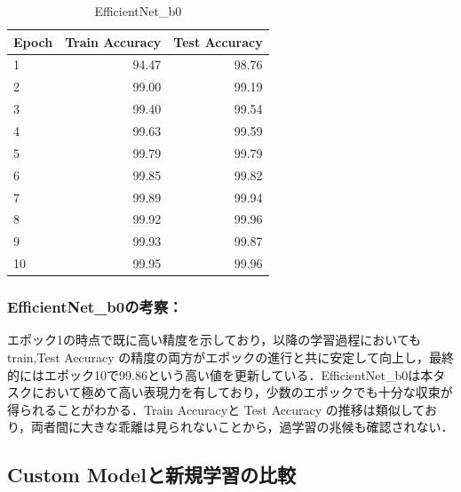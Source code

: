 \documentclass[a4paper,11pt,titlepage]{jsarticle}
\begin{document}
\begin{table}[H]
\centering
\caption{EfficientNet\_b0}
\label{tab:efficientnet}
\begin{tabular}{lrr}
\hline
 Epoch &  Train Accuracy &  Test Accuracy \\
\hline
     1 &           94.47 &                98.76 \\
     2 &           99.00 &                99.19 \\
     3 &           99.40 &                99.54 \\
     4 &           99.63 &                99.59 \\
     5 &           99.79 &                99.79 \\
     6 &           99.85 &                99.82 \\
     7 &           99.89 &                99.94 \\
     8 &           99.92 &                99.96 \\
     9 &           99.93 &                99.87 \\
    10 &           99.95 &                99.96 \\
\hline
\end{tabular}
\end{table}

\clearpage
\subsubsection*{EfficientNet\_b0の考察：}
エポック1の時点で既に高い精度を示しており，以降の学習過程においてもtrain,Test Accuracy の精度の両方がエポックの進行と共に安定して向上し，最終的にはエポック10で99.86という高い値を更新している．EfficientNet\_b0は本タスクにおいて極めて高い表現力を有しており，少数のエポックでも十分な収束が得られることがわかる．Train Accuracyと Test Accuracy の推移は類似しており，両者間に大きな乖離は見られないことから，過学習の兆候も確認されない．


\subsection{Custom Modelと新規学習の比較}


  
\end{document}
